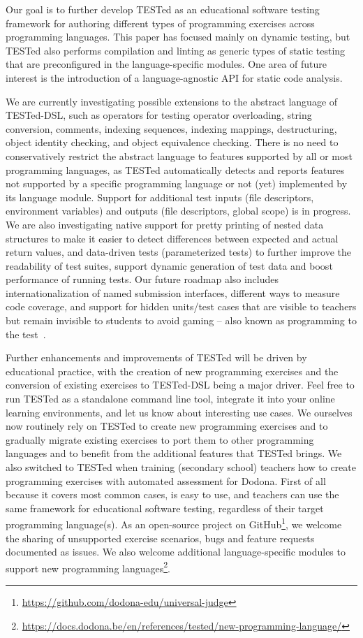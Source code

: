 \documentclass[../main]{subfiles}
\begin{document}
Our goal is to further develop TESTed as an educational software testing framework for authoring different types of programming exercises across programming languages.
This paper has focused mainly on dynamic testing, but TESTed also performs compilation and linting as generic types of static testing that are preconfigured in the language-specific modules.
One area of future interest is the introduction of a language-agnostic API for static code analysis.

We are currently investigating possible extensions to the abstract language of TESTed-DSL, such as operators for testing operator overloading, string conversion, comments, indexing sequences, indexing mappings, destructuring, object identity checking, and object equivalence checking.
There is no need to conservatively restrict the abstract language to features supported by all or most programming languages, as TESTed automatically detects and reports features not supported by a specific programming language or not (yet) implemented by its language module.
Support for additional test inputs (file descriptors, environment variables) and outputs (file descriptors, global scope) is in progress.
We are also investigating native support for pretty printing of nested data structures to make it easier to detect differences between expected and actual return values, and data-driven tests (parameterized tests) to further improve the readability of test suites, support dynamic generation of test data and boost performance of running tests.
Our future roadmap also includes internationalization of named submission interfaces, different ways to measure code coverage, and support for hidden units/test cases that are visible to teachers but remain invisible to students to avoid gaming -- also known as programming to the test~\autocite{pevelerComparingJailedSandboxes2019}.

Further enhancements and improvements of TESTed will be driven by educational practice, with the creation of new programming exercises and the conversion of existing exercises to TESTed-DSL being a major driver.
Feel free to run TESTed as a standalone command line tool, integrate it into your online learning environments, and let us know about interesting use cases.
We ourselves now routinely rely on TESTed to create new programming exercises and to gradually migrate existing exercises to port them to other programming languages and to benefit from the additional features that TESTed brings.
We also switched to TESTed when training (secondary school) teachers how to create programming exercises with automated assessment for Dodona.
First of all because it covers most common cases, is easy to use, and teachers can use the same framework for educational software testing, regardless of their target programming language(s).
As an open-source project on GitHub\footnote{\url{https://github.com/dodona-edu/universal-judge}}, we welcome the sharing of unsupported exercise scenarios, bugs and feature requests documented as issues.
We also welcome additional language-specific modules to support new programming languages\footnote{\url{https://docs.dodona.be/en/references/tested/new-programming-language/}}.
\end{document}
